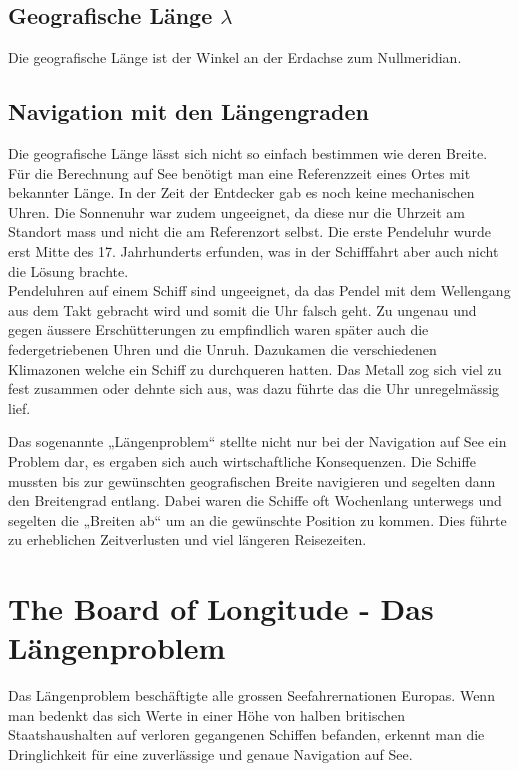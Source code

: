 \begin{refsection}

\subsection{Geografische Länge $\lambda$}
\begin{definition}
Die geografische Länge ist der Winkel an der Erdachse zum Nullmeridian.
\end{definition}

\subsection{Navigation mit den Längengraden}
Die geografische Länge lässt sich nicht so einfach bestimmen wie deren Breite. Für die Berechnung auf See benötigt man eine Referenzzeit eines Ortes mit bekannter Länge.
In der Zeit der Entdecker gab es noch keine mechanischen Uhren. Die Sonnenuhr war zudem ungeeignet, da diese nur die Uhrzeit am Standort mass und nicht die am Referenzort selbst. Die erste Pendeluhr wurde erst Mitte des 17. Jahrhunderts erfunden, was in der Schifffahrt aber auch nicht die Lösung brachte.\\
Pendeluhren auf einem Schiff sind ungeeignet, da das Pendel mit dem Wellengang aus dem Takt gebracht wird und somit die Uhr falsch geht.
Zu ungenau und gegen äussere Erschütterungen zu empfindlich waren später auch die federgetriebenen Uhren und die Unruh. Dazukamen die verschiedenen Klimazonen welche ein Schiff zu durchqueren hatten. Das Metall zog sich viel zu fest zusammen oder dehnte sich aus, was dazu führte das die Uhr unregelmässig lief.

Das sogenannte „Längenproblem“ stellte nicht nur bei der Navigation auf See ein Problem dar, es ergaben sich auch wirtschaftliche Konsequenzen. Die Schiffe mussten bis zur gewünschten geografischen Breite navigieren und segelten dann den Breitengrad entlang. Dabei waren die Schiffe oft Wochenlang unterwegs und segelten die „Breiten ab“ um an die gewünschte Position zu kommen. Dies führte zu erheblichen Zeitverlusten und viel längeren Reisezeiten.


\section{The Board of Longitude - Das Längenproblem}
Das Längenproblem beschäftigte alle grossen Seefahrernationen Europas. Wenn man bedenkt das sich Werte in einer  Höhe von halben britischen Staatshaushalten auf verloren gegangenen Schiffen befanden, erkennt man die Dringlichkeit für eine zuverlässige und genaue Navigation auf See.



\end{refsection}
